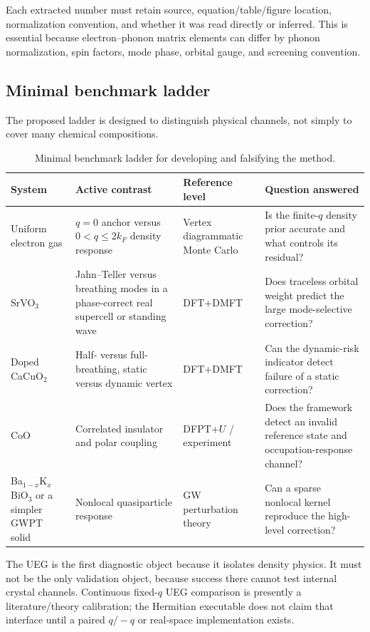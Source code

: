 Each extracted number must retain source, equation/table/figure location,
normalization convention, and whether it was read directly or inferred.  This is
essential because electron--phonon matrix elements can differ by phonon
normalization, spin factors, mode phase, orbital gauge, and screening convention.

\subsection{Minimal benchmark ladder}

The proposed ladder is designed to distinguish physical channels, not simply to
cover many chemical compositions.

\begin{table}[htbp]
\centering
\caption{Minimal benchmark ladder for developing and falsifying the method.}
\label{tab:benchmarks}
\begin{tabularx}{\linewidth}{@{}p{2.7cm}p{3.1cm}XX@{}}
\toprule
System & Active contrast & Reference level & Question answered \\
\midrule
Uniform electron gas & $q=0$ anchor versus $0<q\le2k_F$ density response &
Vertex diagrammatic Monte Carlo & Is the finite-$q$ density prior accurate and
what controls its residual? \\
SrVO$_3$ & Jahn--Teller versus breathing modes in a phase-correct real supercell
or standing wave & DFT+DMFT & Does traceless orbital weight predict the large
mode-selective correction? \\
Doped CaCuO$_2$ & Half- versus full-breathing, static versus dynamic vertex &
DFT+DMFT & Can the dynamic-risk indicator detect failure of a static correction? \\
CoO & Correlated insulator and polar coupling & DFPT+$U$ / experiment & Does the
framework detect an invalid reference state and occupation-response channel? \\
Ba$_{1-x}$K$_x$BiO$_3$ or a simpler GWPT solid & Nonlocal quasiparticle response &
GW perturbation theory & Can a sparse nonlocal kernel reproduce the high-level
correction? \\
\bottomrule
\end{tabularx}
\end{table}

The UEG is the first diagnostic object because it isolates density physics.  It
must not be the only validation object, because success there cannot test internal
crystal channels.  Continuous fixed-$q$ UEG comparison is presently a
literature/theory calibration; the Hermitian executable does not claim that
interface until a paired $q/-q$ or real-space implementation exists.

